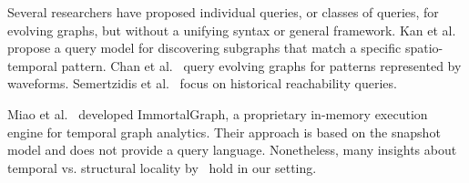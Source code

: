 Several researchers have proposed individual queries, or classes of
queries, for evolving graphs, but without a unifying syntax or general
framework.  Kan et al.~\cite{Kan2009} propose a query model for
discovering subgraphs that match a specific spatio-temporal pattern.
Chan et al.~\cite{Chan2008} query evolving graphs for patterns
represented by waveforms.  Semertzidis et al.~\cite{Semertzidis2015}
focus on historical reachability queries.

Miao et al.~\cite{DBLP:journals/tos/MiaoHLWYZPCC15} developed ImmortalGraph,
a proprietary in-memory execution engine for temporal graph analytics.
Their approach is based on the snapshot model and
does not provide a query 
language.%
Nonetheless, many insights about temporal vs. structural locality
by~\cite{DBLP:journals/tos/MiaoHLWYZPCC15} hold in our setting.

